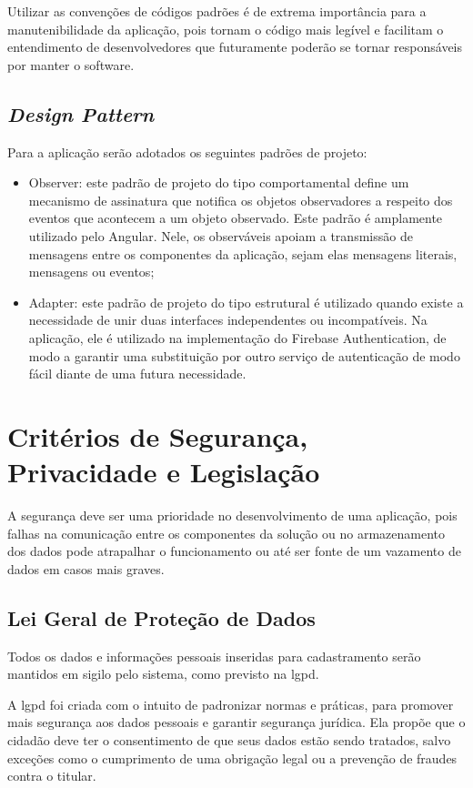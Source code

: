 \documentclass[
    12pt,               %
    openright,          %
    oneside,
    a4paper,            %
    english,            %
    brazil              %
    ]{ifsp-spo-inf-ctds} %
\begin{document}
Utilizar as convenções de códigos padrões é de extrema importância para a manutenibilidade da aplicação, pois tornam o código mais legível e facilitam o entendimento de desenvolvedores que futuramente poderão se tornar responsáveis por manter o software.



\subsection{\textit{Design Pattern}}
Para a aplicação serão adotados os seguintes padrões de projeto:
\begin{itemize}
\item  Observer: este padrão de projeto do tipo comportamental define um mecanismo de assinatura que notifica os objetos observadores a respeito dos eventos que acontecem a um objeto observado. 
Este padrão é amplamente utilizado pelo Angular. Nele, os observáveis apoiam a transmissão de mensagens entre os componentes da aplicação, sejam elas mensagens literais, mensagens ou eventos;
\item Adapter: este padrão de projeto do tipo estrutural é utilizado quando existe a necessidade de unir duas interfaces independentes ou incompatíveis. Na aplicação, ele é utilizado na implementação do Firebase Authentication, de modo a garantir uma substituição por outro serviço de autenticação de modo fácil diante de uma futura necessidade.
\end{itemize}


\section {Critérios de Segurança, Privacidade e Legislação}
A segurança deve ser uma prioridade no desenvolvimento de uma aplicação, pois falhas na comunicação entre os componentes da solução ou no armazenamento dos dados pode atrapalhar o funcionamento ou até ser fonte de um vazamento de dados em casos mais graves. 

\subsection{Lei Geral de Proteção de Dados}
Todos os dados e informações pessoais inseridas para cadastramento serão mantidos em sigilo pelo sistema, como previsto na \ac{lgpd}.

A \ac{lgpd} foi criada com o intuito de padronizar normas e práticas, para promover mais segurança aos dados pessoais e garantir segurança jurídica. Ela propõe que o cidadão deve ter o consentimento de que seus dados estão sendo tratados, salvo exceções como o cumprimento de uma obrigação legal ou a prevenção de fraudes contra o titular.
\end{document}
